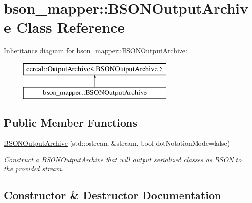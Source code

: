 \hypertarget{classbson__mapper_1_1BSONOutputArchive}{}\section{bson\+\_\+mapper\+:\+:B\+S\+O\+N\+Output\+Archive Class Reference}
\label{classbson__mapper_1_1BSONOutputArchive}
Inheritance diagram for bson\+\_\+mapper\+:\+:B\+S\+O\+N\+Output\+Archive\+:\begin{figure}[H]
\begin{center}
\leavevmode
\includegraphics[height=2.000000cm]{classbson__mapper_1_1BSONOutputArchive}
\end{center}
\end{figure}
\subsection*{Public Member Functions}
\begin{DoxyCompactItemize}
\item 
\hyperlink{classbson__mapper_1_1BSONOutputArchive_a07af9bf8f5a9fa281c6424bfe39f453f}{B\+S\+O\+N\+Output\+Archive} (std\+::ostream \&stream, bool dot\+Notation\+Mode=false)
\begin{DoxyCompactList}\small\item\em Construct a \hyperlink{classbson__mapper_1_1BSONOutputArchive}{B\+S\+O\+N\+Output\+Archive} that will output serialized classes as B\+S\+ON to the provided stream. \end{DoxyCompactList}\end{DoxyCompactItemize}


\subsection{Constructor \& Destructor Documentation}
